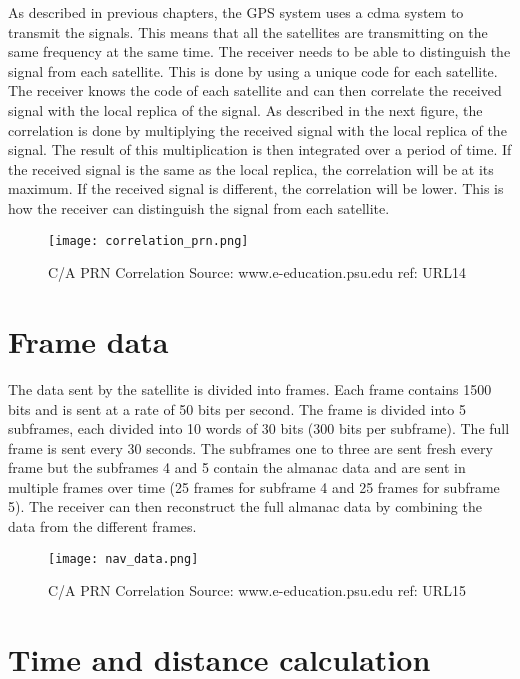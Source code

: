As described in previous chapters, the GPS system uses a \gls{cdma} system to transmit the signals. This means that all the satellites are transmitting on the same frequency at the same time. The receiver needs to be able to distinguish the signal from each satellite. This is done by using a unique code for each satellite. The receiver knows the code of each satellite and can then correlate the received signal with the local replica of the signal. As described in the next figure, the correlation is done by multiplying the received signal with the local replica of the signal. The result of this multiplication is then integrated over a period of time. If the received signal is the same as the local replica, the correlation will be at its maximum. If the received signal is different, the correlation will be lower. This is how the receiver can distinguish the signal from each satellite.

\begin{figure}[H]
	\centering
	\texttt{[image: correlation\_prn.png]}
	\caption[C/A PRN Correlation]{C/A PRN Correlation Source: www.e-education.psu.edu ref: URL14}
	\label{fig:prn_correlation}
\end{figure}


\section{Frame data}

The data sent by the satellite is divided into frames. Each frame contains 1500 bits and is sent at a rate of 50 bits per second. The frame is divided into 5 subframes, each divided into 10 words of 30 bits (300 bits per subframe). The full frame is sent every 30 seconds. The subframes one to three are sent fresh every frame but the subframes 4 and 5 contain the almanac data and are sent in multiple frames over time (25 frames for subframe 4 and 25 frames for subframe 5). The receiver can then reconstruct the full almanac data by combining the data from the different frames.


\begin{figure}[H]
	\centering
	\texttt{[image: nav\_data.png]}
	\caption[C/A PRN Correlation]{C/A PRN Correlation Source: www.e-education.psu.edu ref: URL15}
	\label{fig:nav_data}
\end{figure}

\section{Time and distance calculation}

